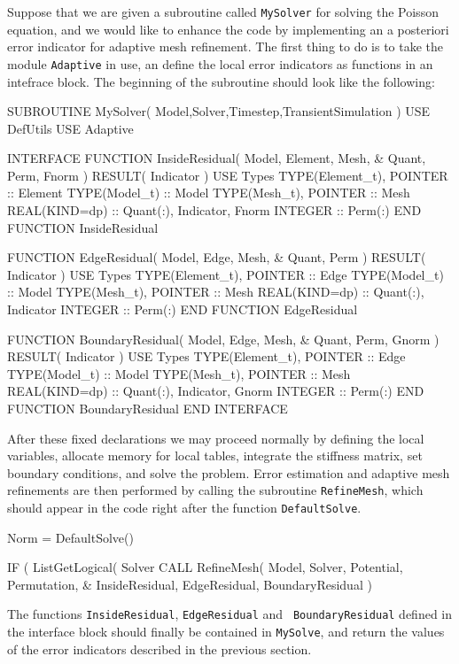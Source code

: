 Suppose that we are given a subroutine called {\tt MySolver} for solving
the Poisson equation, and we would like to enhance the code by implementing
an a posteriori error indicator for adaptive mesh refinement. The first
thing to do is to take the module {\tt Adaptive} in use, an define the local
error indicators as functions in an intefrace block. The beginning of the
subroutine should look like the following:

\ttbegin

SUBROUTINE MySolver( Model,Solver,Timestep,TransientSimulation )
  USE DefUtils
  USE Adaptive

  INTERFACE
    FUNCTION InsideResidual( Model, Element, Mesh, & 
        Quant, Perm, Fnorm ) RESULT( Indicator )
      USE Types
      TYPE(Element_t), POINTER :: Element
      TYPE(Model_t) :: Model
      TYPE(Mesh_t), POINTER :: Mesh
      REAL(KIND=dp) :: Quant(:), Indicator, Fnorm
      INTEGER :: Perm(:)
    END FUNCTION InsideResidual

    FUNCTION EdgeResidual( Model, Edge, Mesh, &
        Quant, Perm ) RESULT( Indicator )
      USE Types
      TYPE(Element_t), POINTER :: Edge
      TYPE(Model_t) :: Model
      TYPE(Mesh_t), POINTER :: Mesh
      REAL(KIND=dp) :: Quant(:), Indicator
      INTEGER :: Perm(:)
    END FUNCTION EdgeResidual

    FUNCTION BoundaryResidual( Model, Edge, Mesh, &
        Quant, Perm, Gnorm ) RESULT( Indicator )
      USE Types
      TYPE(Element_t), POINTER :: Edge
      TYPE(Model_t) :: Model
      TYPE(Mesh_t), POINTER :: Mesh
      REAL(KIND=dp) :: Quant(:), Indicator, Gnorm
      INTEGER :: Perm(:)
    END FUNCTION BoundaryResidual
  END INTERFACE

\ttend

After these fixed declarations we may proceed normally by defining the local
variables, allocate memory for local tables, integrate the stiffness matrix,
set boundary conditions, and solve the problem. Error estimation and adaptive
mesh refinements are then performed by calling the subroutine {\tt RefineMesh},
which should appear in the code right after the function {\tt DefaultSolve}.

\ttbegin
  Norm = DefaultSolve()

  IF ( ListGetLogical( Solver %
      CALL RefineMesh( Model, Solver, Potential, Permutation, &
              InsideResidual, EdgeResidual, BoundaryResidual )
\ttend

The functions {\tt InsideResidual}, {\tt EdgeResidual} and {\tt
BoundaryResidual} defined in the interface block should finally
be contained in {\tt MySolve}, and return the values of the error
indicators described in the previous section.

